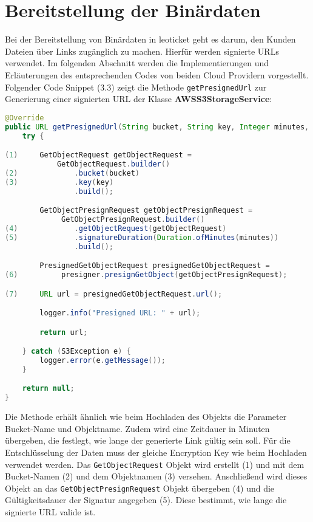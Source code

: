 \newpage

\section{Bereitstellung der Binärdaten}

Bei der Bereitstellung von Binärdaten in leoticket geht es darum, den Kunden Dateien über Links zugänglich zu machen. Hierfür werden signierte URLs verwendet. Im folgenden Abschnitt werden die Implementierungen und Erläuterungen des entsprechenden Codes von beiden Cloud Providern vorgestellt.\\

Folgender Code Snippet (3.3) zeigt die Methode \verb|getPresignedUrl| zur Generierung einer signierten URL der Klasse \textbf{AWSS3StorageService}:

\begin{lstlisting}[language=Java, caption=Prototyp Code Snippet - Generierung einer signierten URL durch AWS]
@Override
public URL getPresignedUrl(String bucket, String key, Integer minutes, String encryptionKey) {
    try {

(1)     GetObjectRequest getObjectRequest = 
			GetObjectRequest.builder()
(2)             .bucket(bucket)
(3)             .key(key)
                .build();

        GetObjectPresignRequest getObjectPresignRequest =                  
             GetObjectPresignRequest.builder()
(4)             .getObjectRequest(getObjectRequest)
(5)             .signatureDuration(Duration.ofMinutes(minutes))
                .build();

        PresignedGetObjectRequest presignedGetObjectRequest =                  
(6)          presigner.presignGetObject(getObjectPresignRequest);

(7)     URL url = presignedGetObjectRequest.url();

        logger.info("Presigned URL: " + url);

        return url;

    } catch (S3Exception e) {
        logger.error(e.getMessage());
    }

    return null;
}
\end{lstlisting}

Die Methode erhält ähnlich wie beim Hochladen des Objekts die Parameter Bucket-Name und Objektname. Zudem wird eine Zeitdauer in Minuten übergeben, die festlegt, wie lange der generierte Link gültig sein soll. Für die Entschlüsselung der Daten muss der gleiche Encryption Key wie beim Hochladen verwendet werden. Das \verb|GetObjectRequest| Objekt wird erstellt (1) und mit dem Bucket-Namen (2) und dem Objektnamen (3) versehen. Anschließend wird dieses Objekt an das \verb|GetObjectPresignRequest| Objekt übergeben (4) und die Gültigkeitsdauer der Signatur angegeben (5). Diese bestimmt, wie lange die signierte URL valide ist.\\

